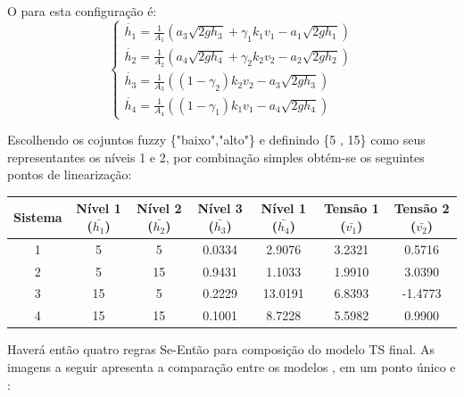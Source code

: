 O  para esta configuração é:
\begin{equation}
\begin{cases}
\dot{h_{1}} = \frac{1}{A_{1}}(a_{3}\sqrt{2gh_{3}} + \gamma_{1}k_{1}v_{1} - a_{1}\sqrt{2gh_{1}})\\

\dot{h_{2}} = \frac{1}{A_{2}}(a_{4}\sqrt{2gh_{4}} + \gamma_{2}k_{2}v_{2} - a_{2}\sqrt{2gh_{2}})\\

\dot{h_{3}} = \frac{1}{A_{3}}((1 - \gamma_{2})k_{2}v_{2} - a_{3}\sqrt{2gh_{3}})\\

\dot{h_{4}} = \frac{1}{A_{4}}((1 - \gamma_{1})k_{1}v_{1} - a_{4}\sqrt{2gh_{4}})
\end{cases}
\label{eqFMNL}
\end{equation}

Escolhendo os cojuntos fuzzy \{"baixo","alto"\} e definindo \{5 , 15\} como seus representantes os níveis 1 e 2, por combinação simples obtém-se os seguintes pontos de linearização:
\begin{center}
	\begin{tabular}{|c|c|c|c|c|c|c|}
		\hline
		Sistema & Nível 1 ($\bar{h_1}$) & Nível 2 ($\bar{h_2}$) & Nível 3 ($\bar{h_3}$) & Nível 1 ($\bar{h_4}$) & Tensão 1 ($\bar{v_1}$) & Tensão 2 ($\bar{v_2}$) \\ \hline
		1 & 5 & 5 & 0.0334 & 2.9076 & 3.2321 & 0.5716 \\ \hline
		2 & 5 & 15 & 0.9431 & 1.1033 & 1.9910 & 3.0390 \\ \hline
		3 & 15 & 5 & 0.2229 & 13.0191 & 6.8393 & -1.4773 \\ \hline
		4 & 15 & 15 & 0.1001 & 8.7228 & 5.5982 & 0.9900 \\	\hline
	\end{tabular}
\end{center}

Haverá então quatro regras Se-Então para composição do modelo TS final. As imagens a seguir apresenta a comparação entre os modelos ,  em um ponto único e :

